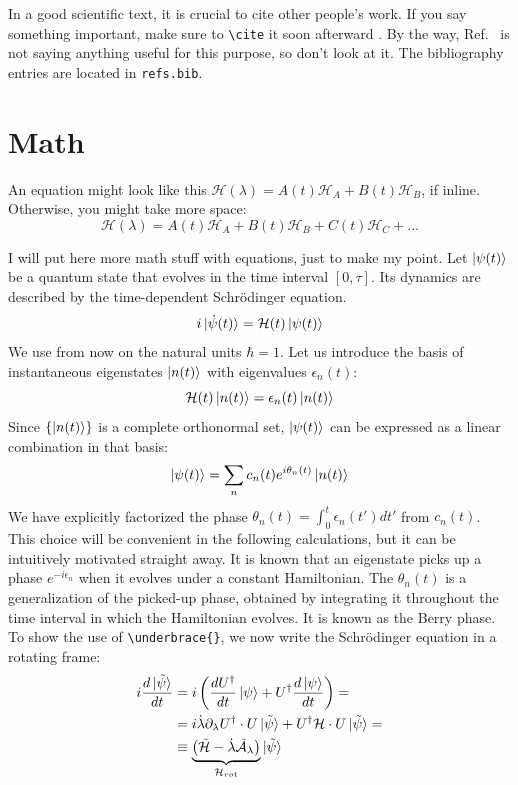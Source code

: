 In a good scientific text, it is crucial to cite other people's work. If you say something important, make sure to \verb|\cite| it soon afterward \cite{10.1088/1367-2630/ad313e}. By the way, Ref.~\cite{10.1088/1367-2630/ad313e} is not saying anything useful for this purpose, so don't look at it. The bibliography entries are located in \texttt{refs.bib}.




\section{Math}

An equation might look like this $\mathcal{H}(\lambda) = A(t)\mathcal{H}_{A} + B(t)\mathcal{H}_{B}$, if inline. 
Otherwise, you might take more space:
\begin{equation*}
    \mathcal{H}(\lambda) = A(t)\mathcal{H}_{A} + B(t)\mathcal{H}_{B} + C(t)\mathcal{H}_{C} + ...
\end{equation*}

I will put here more math stuff with equations, just to make my point. Let $\ket{\psi(t)}$ be a quantum state that evolves in the time interval $[0,\tau]$. Its dynamics are described by the time-dependent Schrödinger equation.
$$i\ket{\dot\psi(t)} = \mathcal{H}(t)\ket{\psi(t)}$$
We use from now on the natural units $\hbar=1$. Let us introduce the basis of instantaneous eigenstates $\ket{n(t)}$ with eigenvalues $\epsilon_n(t)$:
\begin{equation}
    \label{eq:adth-eigenvalue}
    \mathcal{H}(t)\ket{n(t)} = \epsilon_n(t) \ket{n(t)}
\end{equation}
Since $\{\ket{n(t)}\}$ is a complete orthonormal set, $\ket{\psi(t)}$ can be expressed as a linear combination in that basis:
\begin{equation}
    \ket{\psi(t)} = \sum_n c_n(t) e^{i\theta_n(t)} \ket{n(t)}
\end{equation}
We have explicitly factorized the phase $\theta_n(t)=\int_0^t \epsilon_n(t')dt'$ from $c_n(t)$. This choice will be convenient in the following calculations, but it can be intuitively motivated straight away. 
It is known that an eigenstate picks up a phase $e^{-i\epsilon_n}$ when it evolves under a constant Hamiltonian. The $\theta_n(t)$ is a generalization of the picked-up phase, obtained by integrating it throughout the time interval in which the Hamiltonian evolves. It is known as the Berry phase.\\


To show the use of \verb|\underbrace{}|, we now write the Schrödinger equation in a rotating frame:
\begin{align}
    i\frac{d\ket{\tilde{\psi}}}{dt} &= i\left( \frac{dU^\dag}{dt}\ket{\psi} + U^\dag \frac{d\ket{\psi}}{dt} \right) = \nonumber\\
    &= i\dot\lambda \partial_\lambda U^\dag \cdot U\ket{\tilde{\psi}} + U^\dag\mathcal{H}\cdot U\ket{\tilde{\psi}} =\nonumber\\
    & \equiv \underbrace{\left( \tilde{\mathcal{H}} - \dot\lambda \tilde{\mathcal{A}}_\lambda \right)}_{\mathcal{H}_{rot}}\ket{\tilde{\psi}} \label{eq:schr-movingframe}
\end{align}


